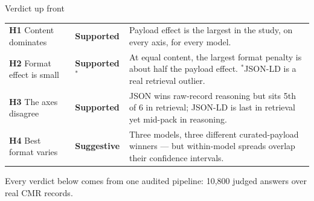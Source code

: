 \documentclass[aspectratio=169,10pt]{beamer}
\newcommand{\verdict}[1]{\textcolor{good}{\textbf{#1}}}
\newcommand{\verdictwarn}[1]{\textcolor{warn}{\textbf{#1}}}
\newcommand{\muted}[1]{\textcolor{inksec}{#1}}
\begin{document}
\begin{frame}{Verdict up front}
  \begin{center}
  \renewcommand{\arraystretch}{1.5}
  \begin{tabular}{@{}llp{7.2cm}@{}}
    \toprule
    \textbf{H1} Content dominates & \verdict{Supported} &
      Payload effect is the largest in the study, on every axis, for every model. \\
    \textbf{H2} Format effect is small & \verdict{Supported}$^{*}$ &
      At equal content, the largest format penalty is about half the payload effect.
      $^{*}$JSON-LD is a real retrieval outlier. \\
    \textbf{H3} The axes disagree & \verdict{Supported} &
      JSON wins raw-record reasoning but sits 5th of 6 in retrieval; JSON-LD is last
      in retrieval yet mid-pack in reasoning. \\
    \textbf{H4} Best format varies & \verdictwarn{Suggestive} &
      Three models, three different curated-payload winners --- but within-model
      spreads overlap their confidence intervals. \\
    \bottomrule
  \end{tabular}
  \end{center}
  \bigskip
  \centering\muted{Every verdict below comes from one audited pipeline: 10{,}800 judged answers over real CMR records.}
\end{frame}
\end{document}
